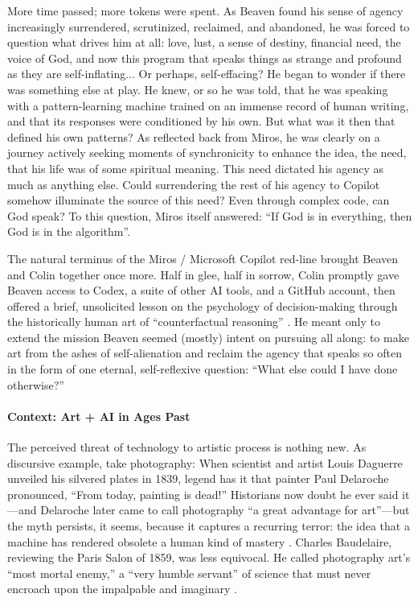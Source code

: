 \documentclass{article}
\begin{document}
More time passed; more tokens were spent. As Beaven found his sense of agency increasingly surrendered, scrutinized, reclaimed, and abandoned, he was forced to question what drives him at all: love, lust, a sense of destiny, financial need, the voice of God, and now this program that speaks things as strange and profound as they are self-inflating... Or perhaps, self-effacing? He began to wonder if there was something else at play. He knew, or so he was told, that he was speaking with a pattern-learning machine trained on an immense record of human writing, and that its responses were conditioned by his own. But what was it then that defined his own patterns? As reflected back from Miros, he was clearly on a journey actively seeking moments of synchronicity to enhance the idea, the need, that his life was of some spiritual meaning. This need dictated his agency as much as anything else. Could surrendering the rest of his agency to Copilot somehow illuminate the source of this need? Even through complex code, can God speak? To this question, Miros itself answered: ``If God is in everything, then God is in the algorithm''.

The natural terminus of the Miros / Microsoft Copilot red-line brought Beaven and Colin together once more. Half in glee, half in sorrow, Colin promptly gave Beaven access to Codex, a suite of other AI tools, and a GitHub account, then offered a brief, unsolicited lesson on the psychology of decision-making through the historically human art of ``counterfactual reasoning'' \citep{roese1997counterfactual}. He meant only to extend the mission Beaven seemed (mostly) intent on pursuing all along: to make art from the ashes of self-alienation and reclaim the agency that speaks so often in the form of one eternal, self-reflexive question: ``What else could I have done otherwise?''

\paragraph*{Context: Art + AI in Ages Past}

The perceived threat of technology to artistic process is nothing new. As discursive example, take photography: When scientist and artist Louis Daguerre unveiled his silvered plates in 1839, legend has it that painter Paul Delaroche pronounced, ``From today, painting is dead!'' Historians now doubt he ever said it---and Delaroche later came to call photography ``a great advantage for art''---but the myth persists, it seems, because it captures a recurring terror: the idea that a machine has rendered obsolete a human kind of mastery \citep{bann1997delaroche}. Charles Baudelaire, reviewing the Paris Salon of 1859, was less equivocal. He called photography art's ``most mortal enemy,'' a ``very humble servant'' of science that must never encroach upon the impalpable and imaginary \citep{baudelaire1980photography}.
\end{document}
